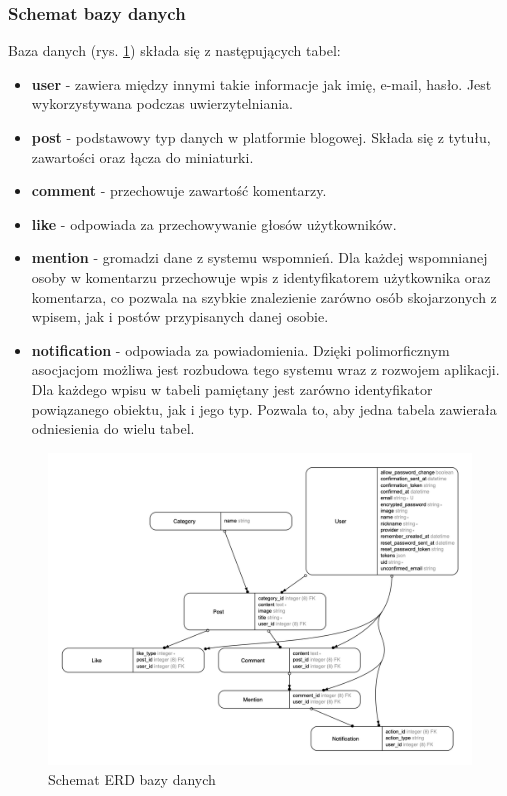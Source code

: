 \documentclass[declaration,shortabstract]{iithesis}
\begin{document}
\subsubsection{Schemat bazy danych}
Baza danych (rys. \ref{fig:erd_diagram}) składa się z następujących tabel: 
\begin{itemize}
    \item \textbf{user} - zawiera między innymi takie informacje jak imię, e-mail, hasło. Jest wykorzystywana podczas uwierzytelniania.
    \item \textbf{post} - podstawowy typ danych w platformie blogowej. Składa się z tytułu, zawartości oraz łącza do miniaturki.
    \item \textbf{comment} - przechowuje zawartość komentarzy.
    \item \textbf{like} - odpowiada za przechowywanie głosów użytkowników.
    \item \textbf{mention} - gromadzi dane z systemu wspomnień. Dla każdej wspomnianej osoby w komentarzu przechowuje wpis z identyfikatorem użytkownika oraz komentarza, co pozwala na szybkie znalezienie zarówno osób skojarzonych z wpisem, jak i postów przypisanych danej osobie.
    \item \textbf{notification} - odpowiada za powiadomienia. Dzięki polimorficznym asocjacjom możliwa jest rozbudowa tego systemu wraz z rozwojem aplikacji. Dla każdego wpisu w tabeli pamiętany jest zarówno identyfikator powiązanego obiektu, jak i jego typ. Pozwala to, aby jedna tabela zawierała odniesienia do wielu tabel.
\end{itemize}

\begin{figure}
    \centering
    \includegraphics[width=\textwidth]{images/erd.png}
    \caption{Schemat ERD bazy danych}
    \label{fig:erd_diagram}
\end{figure}
\end{document}
